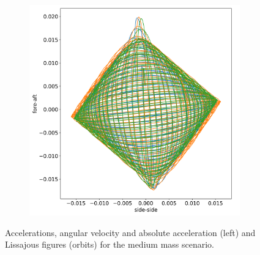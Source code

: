 \documentclass{article}
\begin{document}
\begin{figure}
\begin{subfigure}[b]{0.45\textwidth}
        \includegraphics[width=\textwidth]{../results/experiment/medium_mass_orbit.png}
        \caption{}
        \label{fig:medium-mass:orbit}
    \end{subfigure}
    
    \caption{Accelerations, angular velocity and absolute acceleration (left) and Lissajous figures (orbits) for the medium mass scenario.}
    \label{fig:medium-mass}
\end{figure}

\end{document}
